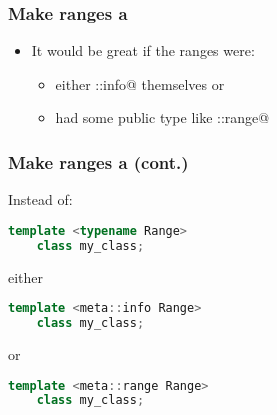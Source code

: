 \documentclass[compress,table,xcolor=table]{beamer}
\begin{document}
\begin{frame}[fragile]
\frametitle{Make ranges a }
    \Huge
    \begin{itemize}
        \item It would be great if the ranges were:
        \begin{itemize}
            \LARGE
            \item either \verb@meta::info@ themselves or
            \item had some public type like \verb@meta::range@
        \end{itemize}
    \end{itemize}
\end{frame}
\begin{frame}[fragile]
\frametitle{Make ranges a  (cont.)}
    \Large
    Instead of:
    \begin{lstlisting}[language=c++]
    template <typename Range>
    class my_class;
    \end{lstlisting}
    either
    \begin{lstlisting}[language=c++]
    template <meta::info Range>
    class my_class;
    \end{lstlisting}
    or
    \begin{lstlisting}[language=c++]
    template <meta::range Range>
    class my_class;
    \end{lstlisting}
\end{frame}
\begin{frame}
    \LARGE
    \vfill
    \Huge
    \vfill
    \large
\end{frame}
\end{document}
